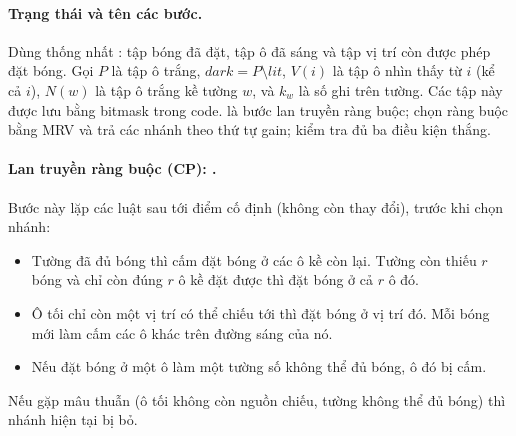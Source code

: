 \paragraph{Trạng thái và tên các bước.} Dùng thống nhất
: tập bóng đã đặt, tập ô đã sáng và tập vị
trí còn được phép đặt bóng. Gọi $P$ là tập ô trắng, $dark=P\setminus lit$,
$V(i)$ là tập ô nhìn thấy từ $i$ (kể cả $i$), $N(w)$ là tập ô trắng kề tường
$w$, và $k_w$ là số ghi trên tường. Các tập này được lưu bằng bitmask trong code.
 là bước lan truyền ràng buộc;
 chọn ràng buộc bằng MRV và trả các nhánh theo thứ
tự gain;  kiểm tra đủ ba điều kiện thắng.

\paragraph{Lan truyền ràng buộc (CP): .} Bước này lặp các luật
sau tới điểm cố định (không còn thay đổi), trước khi chọn nhánh:
\begin{itemize}
\item Tường đã đủ bóng thì cấm đặt bóng ở các ô kề còn lại. Tường còn thiếu $r$
bóng và chỉ còn đúng $r$ ô kề đặt được thì đặt bóng ở cả $r$ ô đó.
\item Ô tối chỉ còn một vị trí có thể chiếu tới thì đặt bóng ở vị trí đó.
Mỗi bóng mới làm cấm các ô khác trên đường sáng của nó.
\item Nếu đặt bóng ở một ô làm một tường số không thể đủ bóng, ô đó bị cấm.
\end{itemize}
Nếu gặp mâu thuẫn (ô tối không còn nguồn chiếu, tường không thể đủ bóng) thì
nhánh hiện tại bị bỏ.

